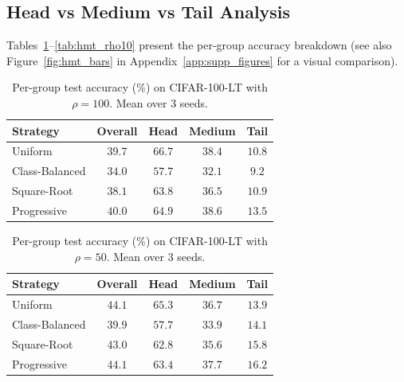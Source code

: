 \documentclass[12pt,a4paper]{article}
\begin{document}
\subsection{Head vs Medium vs Tail Analysis}
\label{sec:hmt_analysis}

Tables~\ref{tab:hmt_rho100}--\ref{tab:hmt_rho10} present the per-group accuracy breakdown (see also Figure~\ref{fig:hmt_bars} in Appendix~\ref{app:supp_figures} for a visual comparison).

\begin{table}[H]
    \centering
    \caption{Per-group test accuracy (\%) on CIFAR-100-LT with $\rho = 100$. Mean over 3 seeds.}
    \label{tab:hmt_rho100}
    \begin{tabular}{lcccc}
        \toprule
        \textbf{Strategy} & \textbf{Overall} & \textbf{Head} & \textbf{Medium} & \textbf{Tail} \\
        \midrule
        Uniform        & $39.7$ & $\mathbf{66.7}$ & $38.4$ & $10.8$ \\
        Class-Balanced & $34.0$ & $57.7$          & $32.1$ & $9.2$  \\
        Square-Root    & $38.1$ & $63.8$          & $36.5$ & $10.9$ \\
        Progressive    & $\mathbf{40.0}$ & $64.9$ & $\mathbf{38.6}$ & $\mathbf{13.5}$ \\
        \bottomrule
    \end{tabular}
\end{table}

\begin{table}[H]
    \centering
    \caption{Per-group test accuracy (\%) on CIFAR-100-LT with $\rho = 50$. Mean over 3 seeds.}
    \label{tab:hmt_rho50}
    \begin{tabular}{lcccc}
        \toprule
        \textbf{Strategy} & \textbf{Overall} & \textbf{Head} & \textbf{Medium} & \textbf{Tail} \\
        \midrule
        Uniform        & $44.1$ & $\mathbf{65.3}$ & $36.7$ & $13.9$ \\
        Class-Balanced & $39.9$ & $57.7$          & $33.9$ & $14.1$ \\
        Square-Root    & $43.0$ & $62.8$          & $35.6$ & $15.8$ \\
        Progressive    & $\mathbf{44.1}$ & $63.4$ & $\mathbf{37.7}$ & $\mathbf{16.2}$ \\
        \bottomrule
    \end{tabular}
\end{table}
\end{document}
